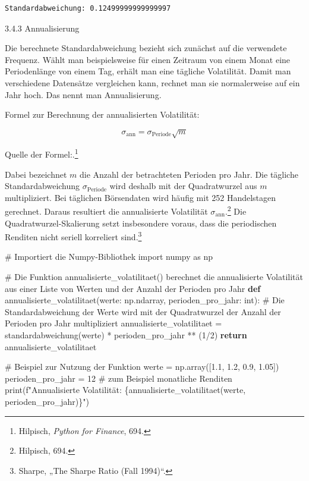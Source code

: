 \documentclass[
  ngerman,
  a4paper,
  DIV=11,
  oneside]{scrreprt}
\newenvironment{Shaded}{\begin{snugshade}}{\end{snugshade}}
\newcommand{\BuiltInTok}[1]{\textcolor[rgb]{0.00,0.23,0.31}{#1}}
\newcommand{\CommentTok}[1]{\textcolor[rgb]{0.37,0.37,0.37}{#1}}
\newcommand{\ControlFlowTok}[1]{\textcolor[rgb]{0.00,0.23,0.31}{\textbf{#1}}}
\newcommand{\DecValTok}[1]{\textcolor[rgb]{0.68,0.00,0.00}{#1}}
\newcommand{\FloatTok}[1]{\textcolor[rgb]{0.68,0.00,0.00}{#1}}
\newcommand{\ImportTok}[1]{\textcolor[rgb]{0.00,0.46,0.62}{#1}}
\newcommand{\KeywordTok}[1]{\textcolor[rgb]{0.00,0.23,0.31}{\textbf{#1}}}
\newcommand{\NormalTok}[1]{\textcolor[rgb]{0.00,0.23,0.31}{#1}}
\newcommand{\OperatorTok}[1]{\textcolor[rgb]{0.37,0.37,0.37}{#1}}
\newcommand{\SpecialCharTok}[1]{\textcolor[rgb]{0.37,0.37,0.37}{#1}}
\newcommand{\SpecialStringTok}[1]{\textcolor[rgb]{0.13,0.47,0.30}{#1}}
\begin{document}
\begin{verbatim}
Standardabweichung: 0.12499999999999997
\end{verbatim}

3.4.3 Annualisierung

Die berechnete Standardabweichung bezieht sich zunächst auf die
verwendete Frequenz. Wählt man beispielsweise für einen Zeitraum von
einem Monat eine Periodenlänge von einem Tag, erhält man eine tägliche
Volatilität. Damit man verschiedene Datensätze vergleichen kann, rechnet
man sie normalerweise auf ein Jahr hoch. Das nennt man Annualisierung.

Formel zur Berechnung der annualisierten Volatilität:

\[
\sigma_{\mathrm{ann}} = \sigma_{\mathrm{Periode}}\sqrt{m}
\]

Quelle der Formel:.\footnote{Hilpisch, \emph{Python for Finance}, 694.}

Dabei bezeichnet \textbf{\(m\)} die Anzahl der betrachteten Perioden pro
Jahr. Die tägliche Standardabweichung
\textbf{\(\sigma_{\text{Periode}}\)} wird deshalb mit der Quadratwurzel
aus \textbf{\(m\)} multipliziert. Bei täglichen Börsendaten wird häufig
mit 252 Handelstagen gerechnet. Daraus resultiert die annualisierte
Volatilität \textbf{\(\sigma_{\text{ann}}\)}.\footnote{Hilpisch, 694.}
Die Quadratwurzel-Skalierung setzt insbesondere voraus, dass die
periodischen Renditen nicht seriell korreliert sind.\footnote{Sharpe,
  {„The {Sharpe Ratio} ({Fall} 1994)``}.}

\begin{Shaded}
\begin{Highlighting}[]
\CommentTok{\# Importiert die Numpy{-}Bibliothek}
\ImportTok{import}\NormalTok{ numpy }\ImportTok{as}\NormalTok{ np}

\CommentTok{\# Die Funktion annualisierte\_volatilitaet() berechnet die annualisierte Volatilität aus einer Liste von Werten und der Anzahl der Perioden pro Jahr}
\KeywordTok{def}\NormalTok{ annualisierte\_volatilitaet(werte: np.ndarray, perioden\_pro\_jahr: }\BuiltInTok{int}\NormalTok{):}
    \CommentTok{\# Die Standardabweichung der Werte wird mit der Quadratwurzel der Anzahl der Perioden pro Jahr multipliziert}
\NormalTok{    annualisierte\_volatilitaet }\OperatorTok{=}\NormalTok{ standardabweichung(werte) }\OperatorTok{*}\NormalTok{ perioden\_pro\_jahr }\OperatorTok{**}\NormalTok{ (}\DecValTok{1}\OperatorTok{/}\DecValTok{2}\NormalTok{)}
    \ControlFlowTok{return}\NormalTok{ annualisierte\_volatilitaet}

\CommentTok{\# Beispiel zur Nutzung der Funktion}
\NormalTok{werte }\OperatorTok{=}\NormalTok{ np.array([}\FloatTok{1.1}\NormalTok{, }\FloatTok{1.2}\NormalTok{, }\FloatTok{0.9}\NormalTok{, }\FloatTok{1.05}\NormalTok{])}
\NormalTok{perioden\_pro\_jahr }\OperatorTok{=} \DecValTok{12}  \CommentTok{\# zum Beispiel monatliche Renditen}
\BuiltInTok{print}\NormalTok{(}\SpecialStringTok{f"Annualisierte Volatilität: }\SpecialCharTok{\{}\NormalTok{annualisierte\_volatilitaet(werte, perioden\_pro\_jahr)}\SpecialCharTok{\}}\SpecialStringTok{"}\NormalTok{)}
\end{Highlighting}
\end{Shaded}
\end{document}
